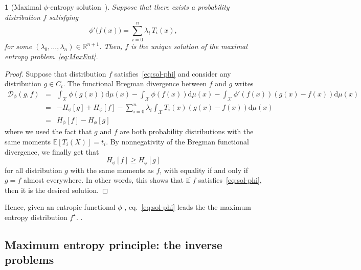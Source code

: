 \documentclass[english,sort&compress]{elsarticle}
\theoremstyle{definition}
\theoremstyle{plain}
\newtheorem{prop}{\protect\propositionname}
\theoremstyle{plain}
\providecommand{\propositionname}{Proposition}
\def\dmu{\mathrm{d}\mu}
\def\fD{\mathcal{D}}
\def\Rset{\mathbb{R}}
\def\X{\mathcal{X}}
\newcommand{\Esp}[1]{\mathbb{E}\left[ #1 \right]}
\begin{document}
\begin{prop}[Maximal           $\phi$-entropy           solution~\cite{KesKap89,
    KesKap90}]\label{prop:sol-phi}
  Suppose that there exists a probability distribution $f$ satisfying
  \begin{equation}\label{eq:sol-phi}
    \phi'\big(f(x)\big) = \sum_{i=0}^n \lambda_i \, T_i(x),
  \end{equation}
  for  some $(\lambda_0,\ldots,\lambda_n)  \in \Rset^{n+1}$.   Then, $f$  is the
  unique solution of the maximal entropy problem~\eqref{eq:MaxEnt}.
\end{prop}
%
\begin{proof}  Suppose that  distribution  $f$ satisfies~\eqref{eq:sol-phi}  and
  consider  any distribution  $g  \in C_t$.  The  functional Bregman  divergence
  between $f$ and $g$ writes
  \begin{eqnarray*}
  \fD_\phi(g,f) & = & \int_\X \phi(g(x)) \dmu(x) - \int_\X \phi(f(x)) \dmu(x) -
  \int_\X \phi'(f(x)) \left( g(x) - f(x) \right) \dmu(x)
  \\[2mm]
  & = & - H_\phi[g] + H_\phi[f] - \sum_{i=0}^n \lambda_i \int_\X T_i(x) 
\left( g(x) - f(x)  \right) \dmu(x) \\[2mm]
  & = & H_\phi[f] - H_\phi[g]
  \end{eqnarray*}
  where we  used the fact  that $g$ and  $f$ are both  probability distributions
  with the same  moments $\Esp{T_i(X)} = t_i$.  By  nonnegativity of the Bregman
  functional divergence, we finally get that
  \[
  H_\phi[f] \ge H_\phi[g]
  \]
  for all distribution $g$ with the  same moments as $f$, with equality if and
  only if  $g = f$ almost  everywhere.  In other  words, this shows that  if $f$
  satisfies~\eqref{eq:sol-phi}, then it is the desired solution.
\end{proof}

Hence, given  an entropic functional $\phi$ ,
eq.~\eqref{eq:sol-phi}    leads   the    the   maximum    entropy   distribution
$f^\star$.  .



\subsection{Maximum entropy principle: the inverse problems}
\end{document}

